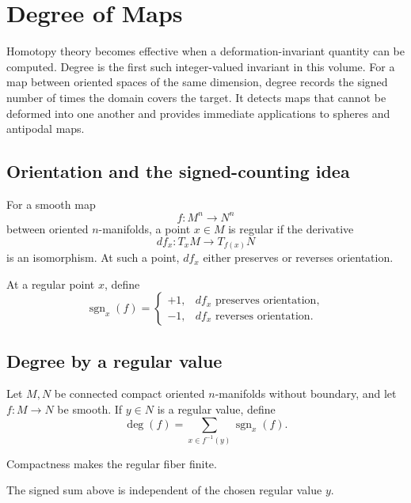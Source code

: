﻿\chapter{Degree of Maps}
\label{ch:viii03-degree}

Homotopy theory becomes effective when a deformation-invariant quantity can be
computed.  Degree is the first such integer-valued invariant in this volume.
For a map between oriented spaces of the same dimension, degree records the
signed number of times the domain covers the target.  It detects maps that
cannot be deformed into one another and provides immediate applications to
spheres and antipodal maps.

\section{Orientation and the signed-counting idea}

For a smooth map
\[
f:M^n\to N^n
\]
between oriented \(n\)-manifolds, a point \(x\in M\) is regular if the derivative
\[
df_x:T_xM\to T_{f(x)}N
\]
is an isomorphism.  At such a point, \(df_x\) either preserves or reverses
orientation.

\begin{definition}
\label{def:viii03-local-sign}
At a regular point \(x\), define
\[
\operatorname{sgn}_x(f)=
\begin{cases}
+1,&df_x\text{ preserves orientation},\\
-1,&df_x\text{ reverses orientation}.
\end{cases}
\]
\end{definition}

\section{Degree by a regular value}

\begin{definition}
\label{def:viii03-degree}
Let \(M,N\) be connected compact oriented \(n\)-manifolds without boundary,
and let \(f:M\to N\) be smooth.  If \(y\in N\) is a regular value, define
\[
\deg(f)
=
\sum_{x\in f^{-1}(y)}
\operatorname{sgn}_x(f).
\]
\end{definition}

Compactness makes the regular fiber finite.

\begin{theorem}
\label{thm:viii03-regular-independence}
The signed sum above is independent of the chosen regular value \(y\).
\end{theorem}

